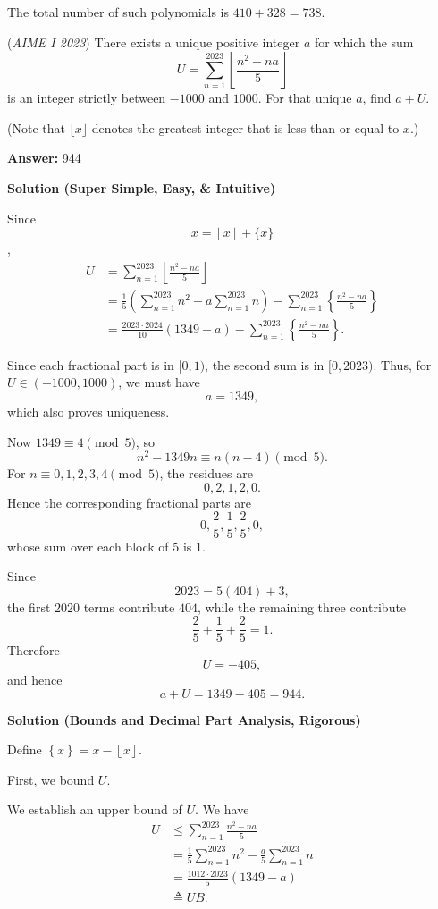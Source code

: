 \begin{enumerate}
{{ The total number of such polynomials is $410 + 328 = \boxed{738}.$



	\item (\textit{AIME I 2023}) There exists a unique positive integer $a$ for which the sum 
 \[U=\sum_{n=1}^{2023}\left\lfloor\dfrac{n^{2}-na}{5}\right\rfloor\] is an integer strictly between $-1000$ and $1000$. For that unique $a$, find $a+U$.


 (Note that $\lfloor x\rfloor$ denotes the greatest integer that is less than or equal to $x$.)


 
 \textbf{Answer: }944



\textbf{Solution (Super Simple, Easy, & Intuitive)}

Since 
 \[x = \left\lfloor x \right\rfloor + \{x\}\],\begin{align*}U &= \sum_{n=1}^{2023}\left\lfloor\frac{n^2-na}{5}\right\rfloor \\&= \frac15\left(\sum_{n=1}^{2023}n^2-a\sum_{n=1}^{2023}n\right) -\sum_{n=1}^{2023}\left\{\frac{n^2-na}{5}\right\} \\&= \frac{2023\cdot2024}{10}(1349-a) -\sum_{n=1}^{2023}\left\{\frac{n^2-na}{5}\right\}.\end{align*}


 
Since each fractional part is in $[0,1)$, the second sum is in $[0,2023)$. Thus, for $U\in(-1000,1000)$, we must have
 \[a=1349,\]which also proves uniqueness.

 Now $1349\equiv4\pmod5$, so
 \[n^2-1349n\equiv n(n-4)\pmod5.\]For $n\equiv0,1,2,3,4\pmod5$, the residues are
 \[0,2,1,2,0.\]Hence the corresponding fractional parts are
 \[0,\frac25,\frac15,\frac25,0,\]whose sum over each block of $5$ is $1$.

 Since
 \[2023=5(404)+3,\]the first $2020$ terms contribute $404$, while the remaining three contribute
 \[\frac25+\frac15+\frac25=1.\]Therefore
 \[U=-405,\]and hence
 \[\boxed{a+U=1349-405=944}.\]




\textbf{Solution (Bounds and Decimal Part Analysis, Rigorous)}

Define $\left\{ x \right\} = x - \left\lfloor x \right\rfloor$.

 First, we bound $U$.

 We establish an upper bound of $U$. We have
 \begin{align*} U & \leq \sum_{n=1}^{2023} \frac{n^2 - na}{5} \\ & = \frac{1}{5} \sum_{n=1}^{2023} n^2 - \frac{a}{5} \sum_{n=1}^{2023} n \\ & = \frac{1012 \cdot 2023}{5} \left( 1349 - a \right) \\ & \triangleq UB . \end{align*}


}}
\end{enumerate}
